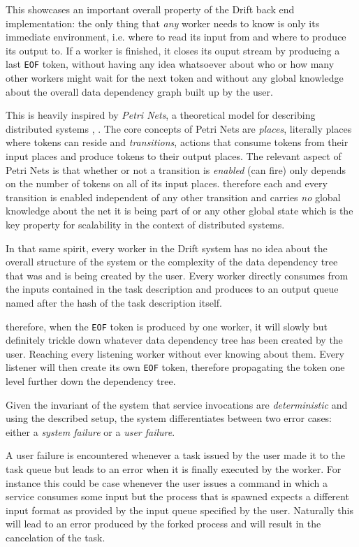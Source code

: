 This showcases an important overall property of the Drift back end
implementation: the only thing that \textit{any} worker needs
to know is only its immediate environment, i.e. where to read its
input from and where to produce its output to. If a worker
is finished, it closes its ouput stream by producing a last
\texttt{EOF} token, without having any idea whatsoever about
who or how many other workers might wait for the next token
and without any global knowledge about the overall
data dependency graph built up by the user.

This is heavily inspired by \textit{Petri Nets}, a theoretical
model for describing distributed systems \cite{pnbook}, \cite{pnwiki}.
The core concepts of Petri Nets are \textit{places}, literally
places where tokens can reside and \textit{transitions}, actions
that consume tokens from their input places and produce tokens
to their output places. The relevant aspect of Petri Nets is that
whether or not a transition is \textit{enabled} (can fire) only
depends on the number of tokens on all of its input places.
therefore each and every transition is enabled independent of
any other transition and carries \textit{no} global knowledge about
the net it is being part of or any other global state which is
the key property for scalability in the context of distributed
systems.

In that same spirit, every worker in the Drift system has no
idea about the overall structure of the system or the complexity
of the data dependency tree that was and is being created by the
user. Every worker directly consumes from the inputs contained
in the task description and produces to an output queue named after
the hash of the task description itself.

therefore, when the \texttt{EOF} token is produced by one worker, it will
slowly but definitely trickle down whatever data dependency tree
has been created by the user. Reaching every listening worker
without ever knowing about them. Every listener will then create
its own \texttt{EOF} token, therefore propagating the token one
level further down the dependency tree.
\newline

Given the invariant of the system that service invocations are
\textit{deterministic} and using the described setup, the system
differentiates between two error cases: either a \textit{system failure}
or a \textit{user failure}.

A user failure is encountered whenever a task issued by the user
made it to the task queue but leads to an error when it is finally
executed by the worker. For instance this could be case whenever
the user issues a command in which a service consumes some input
but the process that is spawned expects a different input format
as provided by the input queue specified by the user. Naturally
this will lead to an error produced by the forked process and
will result in the cancelation of the task.

